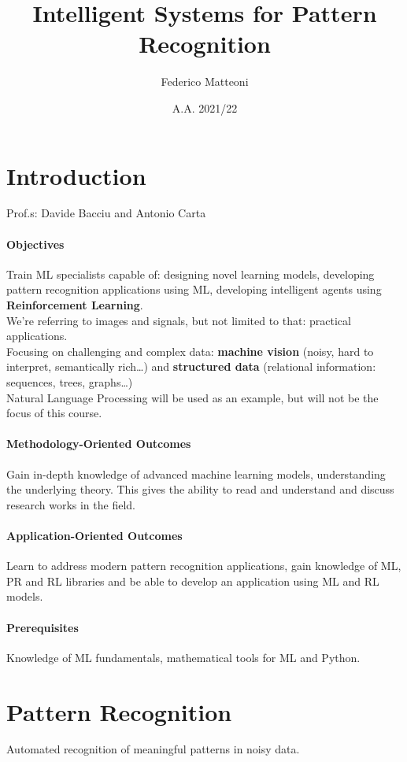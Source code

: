 \documentclass[10pt]{report}
\begin{document}
\title{Intelligent Systems for Pattern Recognition}
\author{Federico Matteoni}
\date{A.A. 2021/22}
\renewcommand*\contentsname{Index}

\maketitle
\tableofcontents
\pagebreak
\section{Introduction}
Prof.s: Davide Bacciu and Antonio Carta
\paragraph{Objectives} Train ML specialists capable of: designing novel learning models, developing pattern recognition applications using ML, developing intelligent agents using \textbf{Reinforcement Learning}.\\
We're referring to images and signals, but not limited to that: practical applications.\\
Focusing on challenging and complex data: \textbf{machine vision} (noisy, hard to interpret, semantically rich\ldots) and \textbf{structured data} (relational information: sequences, trees, graphs\ldots)\\
Natural Language Processing will be used as an example, but will not be the focus of this course.
\paragraph{Methodology-Oriented Outcomes} Gain in-depth knowledge of advanced machine learning models, understanding the underlying theory. This gives the ability to read and understand and discuss research works in the field.
\paragraph{Application-Oriented Outcomes} Learn to address modern pattern recognition applications, gain knowledge of ML, PR and RL libraries and be able to develop an application using ML and RL models.
\paragraph{Prerequisites} Knowledge of ML fundamentals, mathematical tools for ML and Python.
\section{Pattern Recognition}
Automated recognition of meaningful patterns in noisy data.
\end{document}

